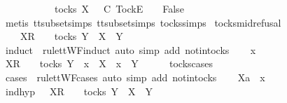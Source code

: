 \begin{isabellebody}
\isamarkupfalse%
\isanewline
\ \ \isamarkupfalse%
\ {\isasymrho}\ {\isasymsigma}\isanewline
\ \ \isamarkupfalse%
\ {\isachardoublequoteopen}{\isasymrho}\ {\isasymin}\ tocks\ X\ {\isasymLongrightarrow}\ {\isasymrho}\ {\isasymsubseteq}\isactrlsub C\ {\isacharbrackleft}Tock{\isacharbrackright}\isactrlsub E\ {\isacharhash}\ {\isasymsigma}\ {\isasymLongrightarrow}\ False{\isachardoublequoteclose}\isanewline
\ \ \ \ \isamarkupfalse%
\ {\isacharparenleft}metis\ tt{\isacharunderscore}subset{\isachardot}simps{\isacharparenleft}{}{}{\isacharparenright}\ tt{\isacharunderscore}subset{\isachardot}simps{\isacharparenleft}{}{}{\isacharparenright}\ tocks{\isachardot}simps{\isacharparenright}\isanewline
{}\isamarkupfalse%
%
\endisatagproof
{\isafoldproof}%
%
\isadelimproof
\isanewline
%
\endisadelimproof
\isanewline
{}\isamarkupfalse%
\ tocks{\isacharunderscore}mid{\isacharunderscore}refusal{\isacharcolon}\isanewline
\ \ {\isachardoublequoteopen}{\isasymrho}\ {\isacharat}\ {\isacharbrackleft}X{\isacharbrackright}\isactrlsub R\ {\isacharhash}\ {\isasymsigma}\ {\isasymin}\ tocks\ Y\ {\isasymLongrightarrow}\ X\ {\isasymsubseteq}\ Y{\isachardoublequoteclose}\isanewline
%
\isadelimproof
%
\endisadelimproof
%
\isatagproof
{}\isamarkupfalse%
\ {\isacharparenleft}induct\ {\isasymrho}\ rule{\isacharcolon}ttWF{\isachardot}induct{\isacharcomma}\ auto\ simp\ add{\isacharcolon}\ notin{\isacharunderscore}tocks{\isacharparenright}\isanewline
\ \ \isamarkupfalse%
\ x\isanewline
\ \ \isamarkupfalse%
\ {\isachardoublequoteopen}{\isacharbrackleft}X{\isacharbrackright}\isactrlsub R\ {\isacharhash}\ {\isasymsigma}\ {\isasymin}\ tocks\ Y\ {\isasymLongrightarrow}\ x\ {\isasymin}\ X\ {\isasymLongrightarrow}\ x\ {\isasymin}\ Y{\isachardoublequoteclose}\isanewline
\ \ \ \ \isamarkupfalse%
\ tocks{\isachardot}cases\ \isamarkupfalse%
\ {\isacharparenleft}cases\ {\isasymsigma}\ rule{\isacharcolon}ttWF{\isachardot}cases{\isacharcomma}\ auto\ simp\ add{\isacharcolon}\ notin{\isacharunderscore}tocks{\isacharparenright}\isanewline
{}\isamarkupfalse%
\isanewline
\ \ \isamarkupfalse%
\ Xa\ {\isasymsigma}{\isacharprime}\ x\isanewline
\ \ \isamarkupfalse%
\ ind{\isacharunderscore}hyp{\isacharcolon}\ {\isachardoublequoteopen}{\isasymsigma}{\isacharprime}\ {\isacharat}\ {\isacharbrackleft}X{\isacharbrackright}\isactrlsub R\ {\isacharhash}\ {\isasymsigma}\ {\isasymin}\ tocks\ Y\ {\isasymLongrightarrow}\ X\ {\isasymsubseteq}\ Y{\isachardoublequoteclose}\isanewline

\end{isabellebody}
